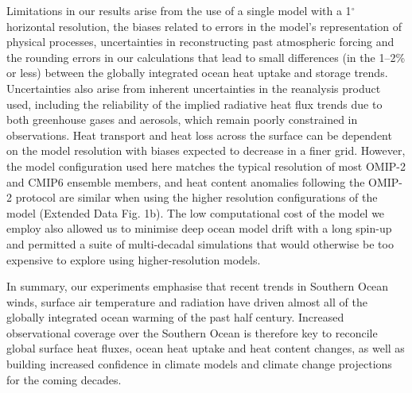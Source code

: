 \documentclass{nature}
\begin{document}
	Limitations in our results arise from the use of a single model with a 1$^{\circ}$ horizontal resolution, the biases related to errors in the model's representation of physical processes, uncertainties in reconstructing past atmospheric forcing and the rounding errors in our calculations that lead to small differences (in the 1--2\% or less) between the globally integrated ocean heat uptake and storage trends. Uncertainties also arise from inherent uncertainties in the reanalysis product used, including the reliability of the implied radiative heat flux trends due to both greenhouse gases and aerosols, which remain poorly constrained in observations. Heat transport and heat loss across the surface can be dependent on the model resolution\cite{grist2018atlantic_heat} with biases expected to decrease in a finer grid\cite{tsujino2020omip}. However, the model configuration used here matches the typical resolution of most OMIP-2 and CMIP6 ensemble members, and heat content anomalies following the OMIP-2 protocol are similar when using the higher resolution configurations of the model (Extended Data Fig. 1b). The low computational cost of the model we employ also allowed us to minimise deep ocean model drift with a long spin-up and permitted a suite of multi-decadal simulations that would otherwise be too expensive to explore using higher-resolution models.
	
	In summary, our experiments emphasise that recent trends in Southern Ocean winds, surface air temperature and radiation have driven almost all of the globally integrated ocean warming of the past half century. Increased observational coverage over the Southern Ocean is therefore key to reconcile global surface heat fluxes, ocean heat uptake and heat content changes, as well as building increased confidence in climate models and climate change projections for the coming decades.
	
\end{document}
